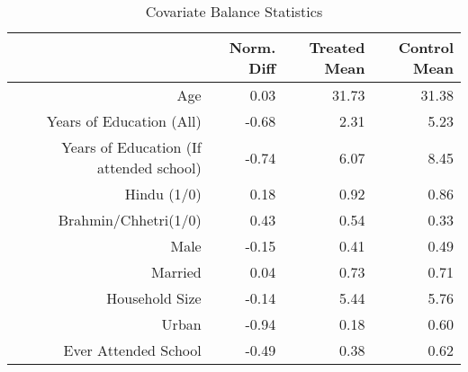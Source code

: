 \begin{table}[ht]
\centering
\begin{tabular}{rrrr}
  \toprule
 & Norm. Diff & Treated Mean & Control Mean \\ 
  \midrule
Age & 0.03 & 31.73 & 31.38 \\ 
  Years of Education (All) & -0.68 & 2.31 & 5.23 \\ 
  Years of Education (If attended school) & -0.74 & 6.07 & 8.45 \\ 
  Hindu (1/0) & 0.18 & 0.92 & 0.86 \\ 
  Brahmin/Chhetri(1/0) & 0.43 & 0.54 & 0.33 \\ 
  Male & -0.15 & 0.41 & 0.49 \\ 
  Married & 0.04 & 0.73 & 0.71 \\ 
  Household Size & -0.14 & 5.44 & 5.76 \\ 
  Urban & -0.94 & 0.18 & 0.60 \\ 
  Ever Attended School & -0.49 & 0.38 & 0.62 \\ 
   \bottomrule
\end{tabular}
\caption{Covariate Balance Statistics} 
\end{table}
